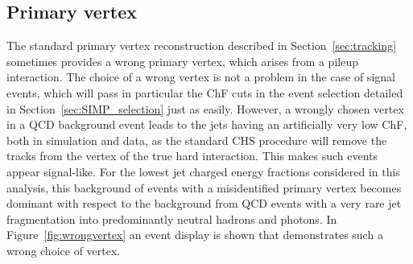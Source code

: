\subsection{Primary vertex}


The standard primary  vertex reconstruction described in Section~\ref{sec:tracking} sometimes provides a wrong primary vertex, which arises from a pileup interaction. The choice of a wrong vertex is not a problem in the case of signal events, which will pass in particular the ChF cuts in the event selection detailed in Section~\ref{sec:SIMP_selection} just as easily. However, a wrongly chosen vertex in a \ac{QCD} background event leads to the jets having an artificially very low ChF, both in simulation and data, as the standard \acf{CHS} procedure will remove the tracks from the vertex of the true hard interaction. This makes such events appear signal-like. For the lowest jet charged energy fractions considered in this analysis, this background of events with a misidentified primary vertex becomes dominant with respect to the background from \ac{QCD} events with a very rare jet fragmentation into predominantly neutral hadrons and photons. In Figure~\ref{fig:wrongvertex} an event display is shown that demonstrates such a wrong choice of vertex.

